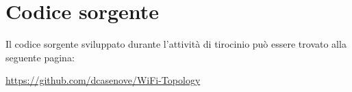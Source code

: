 \chapter{Codice sorgente}

Il codice sorgente sviluppato durante l'attivit\`a di tirocinio pu\`o essere trovato alla seguente pagina:

\url{https://github.com/dcasenove/WiFi-Topology}
